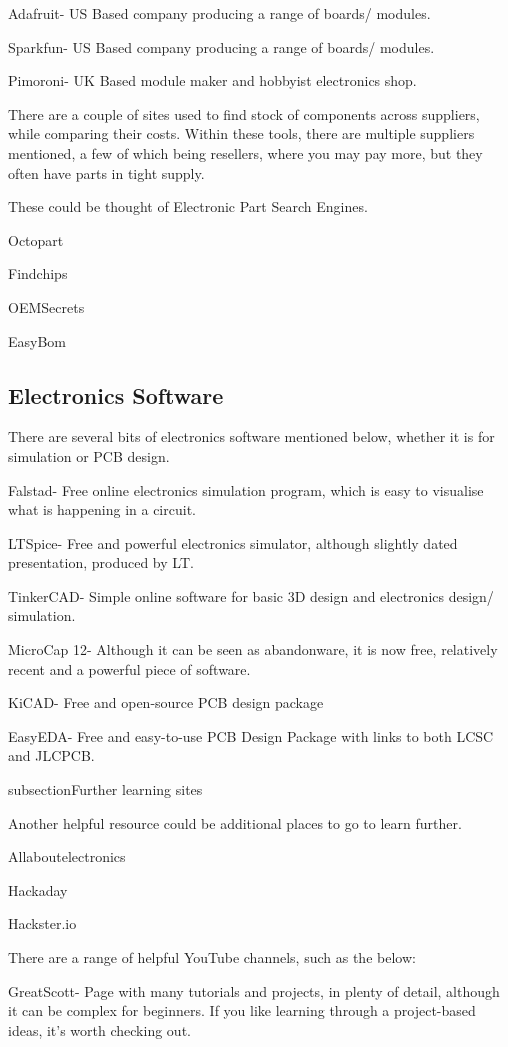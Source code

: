 \documentclass[a4paper,11pt]{report}
\begin{document}
Adafruit- US Based company producing a range of boards/ modules.

Sparkfun- US Based company producing a range of boards/ modules.

Pimoroni- UK Based module maker and hobbyist electronics shop.


There are a couple of sites used to find stock of components across suppliers, while comparing their costs. Within these tools, there are multiple suppliers mentioned, a few of which being resellers, where you may pay more, but they often have parts in tight supply.

These could be thought of Electronic Part Search Engines.

Octopart

Findchips

OEMSecrets

EasyBom


\subsection{Electronics Software}

There are several bits of electronics software mentioned below, whether it is for simulation or PCB design.

Falstad- Free online electronics simulation program, which is easy to visualise what is happening in a circuit.

LTSpice- Free and powerful electronics simulator, although slightly dated presentation, produced by LT.

TinkerCAD- Simple online software for basic 3D design and electronics design/ simulation.

MicroCap 12- Although it can be seen as abandonware, it is now free, relatively recent and a powerful piece of software.

KiCAD- Free and open-source PCB design package

EasyEDA- Free and easy-to-use PCB Design Package with links to both LCSC and JLCPCB.

subsection{Further learning sites}

Another helpful resource could be additional places to go to learn further.

Allaboutelectronics

Hackaday

Hackster.io

There are a range of helpful YouTube channels, such as the below:

GreatScott- Page with many tutorials and projects, in plenty of detail, although it can be complex for beginners. If you like learning through a project-based ideas, it's worth checking out.
\end{document}
